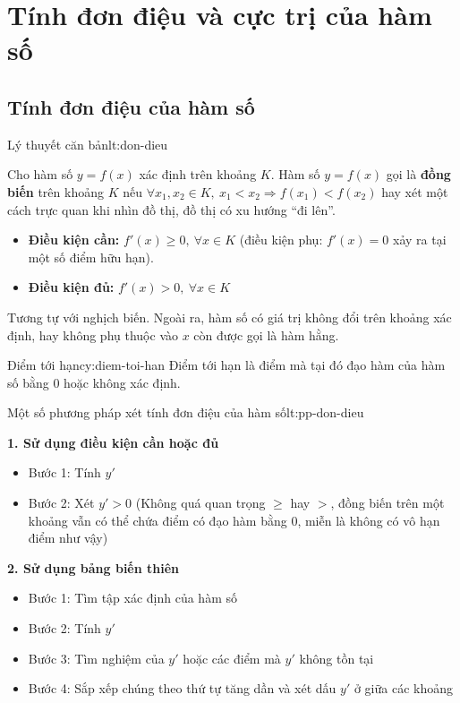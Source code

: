 \chapter{Tính đơn điệu và cực trị của hàm số}
\label{ch:chapter-1}

\section{Tính đơn điệu của hàm số}

\begin{lythuyetbox}{Lý thuyết căn bản}{lt:don-dieu}

Cho hàm số $y = f(x)$ xác định trên khoảng $K$.
Hàm số $y = f(x)$ gọi là \textbf{đồng biến} trên khoảng $K$ nếu $\forall x_1, x_2 \in K,\ x_1 < x_2 \Rightarrow f(x_1) < f(x_2)$ hay xét một cách trực quan khi nhìn đồ thị, đồ thị có xu hướng “đi lên”.

\begin{itemize}
    \item \textbf{Điều kiện cần:} $f'(x) \geq 0,\ \forall x \in K$ (điều kiện phụ: $f'(x) = 0$ xảy ra tại một số điểm hữu hạn).
    \item \textbf{Điều kiện đủ:} $f'(x) > 0,\ \forall x \in K$
\end{itemize}

Tương tự với nghịch biến. Ngoài ra, hàm số có giá trị không đổi trên khoảng xác định, hay không phụ thuộc vào $x$ còn được gọi là hàm hằng.

\begin{chuy}{Điểm tới hạn}{cy:diem-toi-han}
    Điểm tới hạn là điểm mà tại đó đạo hàm của hàm số bằng 0 hoặc không xác định.
\end{chuy}

\end{lythuyetbox}

\begin{lythuyetbox}{Một số phương pháp xét tính đơn điệu của hàm số}{lt:pp-don-dieu}

\textbf{1. Sử dụng điều kiện cần hoặc đủ}

\begin{itemize}
    \item Bước 1: Tính $y'$
    \item Bước 2: Xét $y' > 0$ (Không quá quan trọng $\geq$ hay $>$, đồng biến trên một khoảng vẫn có thể chứa điểm có đạo hàm bằng 0, miễn là không có vô hạn điểm như vậy)
\end{itemize}

\textbf{2. Sử dụng bảng biến thiên}

\begin{itemize}
    \item Bước 1: Tìm tập xác định của hàm số
    \item Bước 2: Tính $y'$
    \item Bước 3: Tìm nghiệm của $y'$ hoặc các điểm mà $y'$ không tồn tại
    \item Bước 4: Sắp xếp chúng theo thứ tự tăng dần và xét dấu $y'$ ở giữa các khoảng
\end{itemize}

\end{lythuyetbox}

